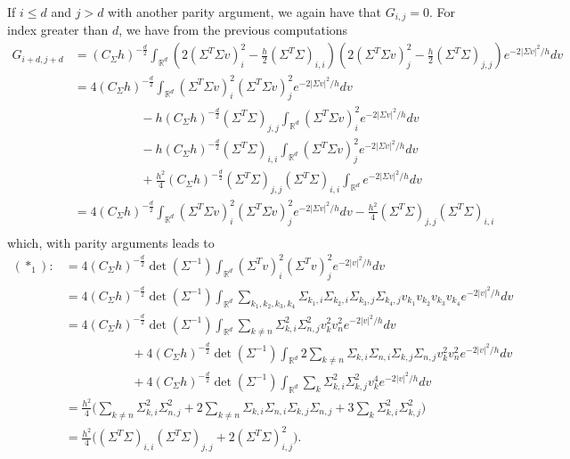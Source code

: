 \documentclass[12pt]{amsart}
\newcommand{\R}{\mathbb R}
\numberwithin{equation}{section}
\numberwithin{figure}{section}
\begin{document}
If $i\leq d$ and $j>d$ with another parity argument, we again have that $G_{i,j} = 0$. For index greater than $d$, we have from the previous computations
\begin{equation*}
\begin{aligned}
    G_{i+d,j+d} &= (C_\Sigma h)^{-\frac d2}\int_{\R^d}(2(\Sigma^T\Sigma v)_i^2 - \frac h2(\Sigma^T\Sigma)_{i,i})(2(\Sigma^T\Sigma v)_j^2 - \frac h2(\Sigma^T\Sigma)_{j,j})e^{-2|\Sigma v|^2/h}dv\\
    &= 4(C_\Sigma h)^{-\frac d2}\int_{\R^d}(\Sigma^T\Sigma v)_i^2(\Sigma^T\Sigma v)_j^2e^{-2|\Sigma v|^2/h}dv\\
    &\phantom{********} - h(C_\Sigma h)^{-\frac d2}(\Sigma^T\Sigma)_{j,j}\int_{\R^d}(\Sigma^T\Sigma v)_i^2e^{-2|\Sigma v|^2/h}dv\\
    &\phantom{********} - h(C_\Sigma h)^{-\frac d2}(\Sigma^T\Sigma)_{i,i}\int_{\R^d}(\Sigma^T\Sigma v)_j^2e^{-2|\Sigma v|^2/h}dv\\
    &\phantom{********} + \frac{h^2}{4}(C_\Sigma h)^{-\frac d2}(\Sigma^T\Sigma)_{j,j}(\Sigma^T\Sigma)_{i,i}\int_{\R^d}e^{-2|\Sigma v|^2/h}dv\\
    &= 4(C_\Sigma h)^{-\frac d2}\int_{\R^d}(\Sigma^T\Sigma v)_i^2(\Sigma^T\Sigma v)_j^2e^{-2|\Sigma v|^2/h}dv - \frac{h^2}{4}(\Sigma^T\Sigma)_{j,j}(\Sigma^T\Sigma)_{i,i}\\
\end{aligned}
\end{equation*}
which, with parity arguments leads to 
\begin{equation*}
\begin{aligned}
    (\ast_1) :&= 4(C_\Sigma h)^{-\frac d2}\det(\Sigma^{-1})\int_{\R^d}(\Sigma^Tv)_i^2(\Sigma^T v)_j^2e^{-2|v|^2/h}dv\\
    &= 4(C_\Sigma h)^{-\frac d2}\det(\Sigma^{-1})\int_{\R^d}\sum_{k_1,k_2,k_3,k_4}\Sigma_{k_1,i}\Sigma_{k_2,i}\Sigma_{k_3,j}\Sigma_{k_4,j}v_{k_1}v_{k_2}v_{k_3}v_{k_4}e^{-2|v|^2/h}dv\\
    &= 4(C_\Sigma h)^{-\frac d2}\det(\Sigma^{-1})\int_{\R^d}\sum_{k\neq n}\Sigma_{k,i}^2\Sigma_{n,j}^2v_k^2v_n^2e^{-2|v|^2/h}dv\\
    &\phantom{********} + 4(C_\Sigma h)^{-\frac d2}\det(\Sigma^{-1})\int_{\R^d}2\sum_{k\neq n}\Sigma_{k,i}\Sigma_{n,i}\Sigma_{k,j}\Sigma_{n,j}v_k^2v_n^2e^{-2|v|^2/h}dv\\
    &\phantom{********} + 4(C_\Sigma h)^{-\frac d2}\det(\Sigma^{-1})\int_{\R^d}\sum_{k}\Sigma_{k,i}^2\Sigma_{k,j}^2v_k^4e^{-2|v|^2/h}dv\\
    &= \frac{h^2}{4}\big(\sum_{k\neq n}\Sigma_{k,i}^2\Sigma_{n,j}^2 + 2\sum_{k\neq n}\Sigma_{k,i}\Sigma_{n,i}\Sigma_{k,j}\Sigma_{n,j} + 3\sum_{k}\Sigma_{k,i}^2\Sigma_{k,j}^2\big)\\
    &= \frac{h^2}{4}\big((\Sigma^T\Sigma)_{i,i}(\Sigma^T\Sigma)_{j,j} + 2(\Sigma^T\Sigma)_{i,j}^2\big).
\end{aligned}
\end{equation*}
\end{document}
